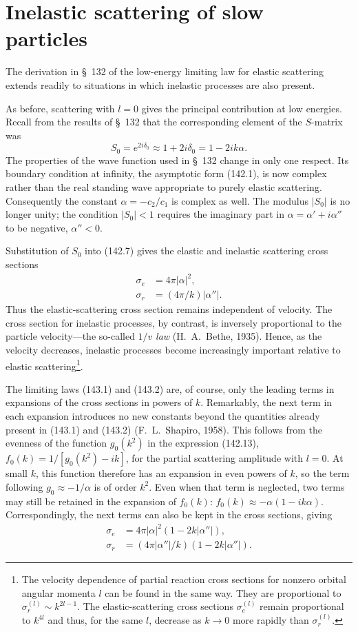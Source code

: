 \section{Inelastic scattering of slow particles}

The derivation in \S~132 of the low-energy limiting law for elastic scattering extends readily to situations in which inelastic processes are also present.

As before, scattering with $l=0$ gives the principal contribution at low energies. Recall from the results of \S~132 that the corresponding element of the $S$-matrix was
\[
 S_0=e^{2i\delta_0}\approx1+2i\delta_0=1-2ik\alpha.
\]
The properties of the wave function used in \S~132 change in only one respect. Its boundary condition at infinity, the asymptotic form (142.1), is now complex rather than the real standing wave appropriate to purely elastic scattering. Consequently the constant $\alpha=-c_2/c_1$ is complex as well. The modulus $|S_0|$ is no longer unity; the condition $|S_0|<1$ requires the imaginary part in $\alpha=\alpha'+i\alpha''$ to be negative, $\alpha''<0$.

Substitution of $S_0$ into (142.7) gives the elastic and inelastic scattering cross sections
\begin{align}
 \sigma_e&=4\pi|\alpha|^2, \tag{143.1}\\
 \sigma_r&=(4\pi/k)|\alpha''|. \tag{143.2}
\end{align}
Thus the elastic-scattering cross section remains independent of velocity. The cross section for inelastic processes, by contrast, is inversely proportional to the particle velocity---the%
%
so-called $1/v$ \emph{law} (H.~A.~Bethe, 1935). Hence, as the velocity decreases, inelastic processes become increasingly important relative to elastic scattering\footnote{The velocity dependence of partial reaction cross sections for nonzero orbital angular momenta $l$ can be found in the same way. They are proportional to $\sigma_r^{(l)}\sim k^{2l-1}$. The elastic-scattering cross sections $\sigma_e^{(l)}$ remain proportional to $k^{4l}$ and thus, for the same $l$, decrease as $k\to0$ more rapidly than $\sigma_r^{(l)}$.}.

The limiting laws (143.1) and (143.2) are, of course, only the leading terms in expansions of the cross sections in powers of $k$. Remarkably, the next term in each expansion introduces no new constants beyond the quantities already present in (143.1) and (143.2) (F.~L.~Shapiro, 1958). This follows from the evenness of the function $g_0(k^2)$ in the expression (142.13), $f_0(k)=1/[g_0(k^2)-ik]$, for the partial scattering amplitude with $l=0$. At small $k$, this function therefore has an expansion in even powers of $k$, so the term following $g_0\approx-1/\alpha$ is of order $k^2$. Even when that term is neglected, two terms may still be retained in the expansion of $f_0(k)$: $f_0(k)\approx-\alpha(1-ik\alpha)$. Correspondingly, the next terms can also be kept in the cross sections, giving
\begin{align}
 \sigma_e&=4\pi|\alpha|^2(1-2k|\alpha''|), \tag{143.3}\\
 \sigma_r&=(4\pi|\alpha''|/k)(1-2k|\alpha''|). \tag{143.4}
\end{align}

